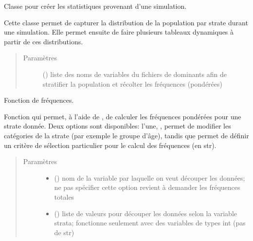\documentclass[letterpaper,10pt,french]{sphinxmanual}
\begin{document}
\begin{fulllineitems}
\label{\detokenize{utilisation:simgen.statistics}}
Classe pour créer les statistiques provenant d’une simulation.

Cette classe permet de capturer la distribution de la population par strate durant une simulation. Elle permet ensuite de faire plusieurs tableaux dynamiques à partir de ces distributions.
\begin{quote}\begin{description}
\item[{Paramètres}] \leavevmode
{} () \textendash{} liste des noms de variables du fichiers de dominants afin de stratifier la population et récolter les fréquences (pondérées)

\end{description}\end{quote}

\begin{fulllineitems}
\label{\detokenize{utilisation:simgen.statistics.freq}}
Fonction de fréquences.

Fonction qui permet, à l’aide de , de calculer les fréquences pondérées pour une strate donnée. Deux options sont disponibles: l’une, , permet de modifier les catégories de la strate (par exemple le groupe d’âge), tandis que  permet de définir un critère de sélection particulier pour le calcul des fréquences (en str).
\begin{quote}\begin{description}
\item[{Paramètres}] \leavevmode\begin{itemize}
\item {} 
 () \textendash{} nom de la variable par laquelle on veut découper les données; ne pas spécifier cette option revient à demander les fréquences totales

\item {} 
 () \textendash{} liste de valeurs pour découper les données selon la variable strata; fonctionne seulement avec des variables de types int (pas de str)


\end{itemize}
\end{description}
\end{quote}
\end{fulllineitems}
\end{fulllineitems}
\end{document}
